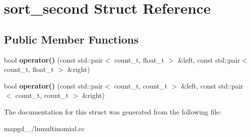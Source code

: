 \hypertarget{structsort__second}{\section{sort\-\_\-second Struct Reference}
\label{structsort__second}
}
\subsection*{Public Member Functions}
\begin{DoxyCompactItemize}
\item 
\hypertarget{structsort__second_a09effe9a4855dd805a4b49e3b4f3a1df}{bool {\bfseries operator()} (const std\-::pair$<$ count\-\_\-t, float\-\_\-t $>$ \&left, const std\-::pair$<$ count\-\_\-t, float\-\_\-t $>$ \&right)}\label{structsort__second_a09effe9a4855dd805a4b49e3b4f3a1df}

\item 
\hypertarget{structsort__second_a41cfd4e51b8c799926d881a00a545d35}{bool {\bfseries operator()} (const std\-::pair$<$ count\-\_\-t, count\-\_\-t $>$ \&left, const std\-::pair$<$ count\-\_\-t, count\-\_\-t $>$ \&right)}\label{structsort__second_a41cfd4e51b8c799926d881a00a545d35}

\end{DoxyCompactItemize}


The documentation for this struct was generated from the following file\-:\begin{DoxyCompactItemize}
\item 
mapgd\-\_./lnmultinomial.\-cc\end{DoxyCompactItemize}
